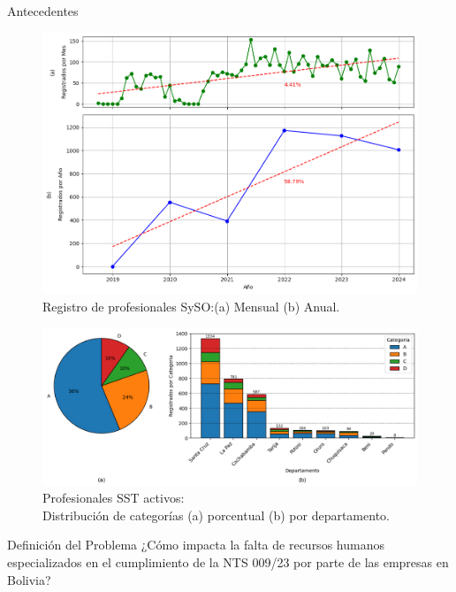 \documentclass[spanish]{beamer} %
\begin{document}
\begin{frame}[allowframebreaks]{Antecedentes}
    \begin{figure}
        \centering
        \includegraphics[width=\textwidth, height=.7\textheight]{../images/marcoref/tendencia_profesionales_syso_registrados.png}
        \caption{Registro de profesionales SySO:(a) Mensual (b) Anual.}
        \label{fig:profesionales_syso_registrados}
    \end{figure}

    \begin{figure}
      \centering
      \includegraphics[width=1\textwidth]{../images/marcoref/profesionales_syso_por_categoria.png}
      \caption{Profesionales SST activos:\\Distribución de categorías (a) porcentual (b) por departamento.}
      \label{fig:profesionales_syso_por_categoria} 
    \end{figure}
\end{frame}

\begin{frame}{Definición del Problema}
  ¿Cómo impacta la falta de recursos humanos especializados en el cumplimiento de la NTS 009/23 por parte de las empresas en Bolivia?
\end{frame}
\end{document}
